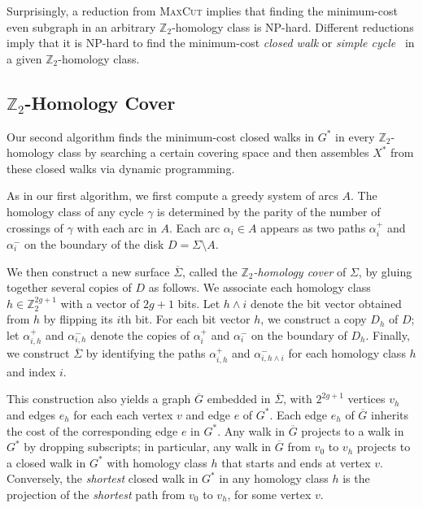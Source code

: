 \documentclass[natbib]{svcyclop}
\begin{document}
Surprisingly, a reduction from \textsc{MaxCut} implies that finding the minimum-cost even subgraph in an arbitrary $\mathbb{Z}_2$-homology class is NP-hard.  Different reductions imply that it is NP-hard to find the minimum-cost \emph{closed walk} \cite{ccelw-scsih-08} or \emph{simple cycle}~\cite{c-fscss-10} in a given $\mathbb{Z}_2$-homology class.

\subsection{$\mathbb{Z}_2$-Homology Cover}

Our second algorithm \cite{en-mcsnc-11} finds the minimum-cost closed walks in $G^*$ in every $\mathbb{Z}_2$-homology class by searching a certain covering space and then assembles $X^*$ from these closed walks via dynamic programming.

As in our first algorithm, we first compute a greedy system of arcs $A$.
The homology class of any cycle $\gamma$ is determined by the parity of the number of crossings of $\gamma$ with each arc in $A$.
Each arc $\alpha_i\in A$ appears as two paths $\alpha_i^+$ and $\alpha_i^-$ on the boundary of the disk $D = \Sigma\setminus A$.

We then construct a new surface $\overline\Sigma$, called the \emph{$\mathbb{Z}_2$-homology cover} of $\Sigma$, by gluing together several copies of $D$ as follows.   We associate each homology class $h\in\mathbb{Z}_2^{2g+1}$ with a vector of $2g+1$ bits.  Let $h \land i$ denote the bit vector obtained from $h$ by flipping its $i$th bit.  For each bit vector $h$, we construct a copy $D_h$ of $D$; let $\alpha^+_{i,h}$ and $\alpha^-_{i,h}$ denote the copies of $\alpha_i^+$ and $\alpha_i^-$ on the boundary of $D_h$.  Finally, we construct $\overline\Sigma$ by identifying the paths $\alpha^+_{i,h}$ and $\alpha^-_{i,h \land i}$ for each homology class $h$ and index $i$.%

This construction also yields a graph $\overline{G}$ embedded in $\overline\Sigma$, with $2^{2g+1}$ vertices $v_h$ and edges $e_h$ for each each vertex $v$ and edge $e$ of $G^*$.
Each edge $e_h$ of $\overline{G}$ inherits the cost of the corresponding edge $e$ in $G^*$.  
Any walk in $\overline{G}$ projects to a walk in $G^*$ by dropping subscripts; in particular, any walk in $\overline{G}$ from $v_0$ to $v_h$ projects to a closed walk in $G^*$ with homology class $h$ that starts and ends at vertex $v$.
Conversely, the \emph{shortest} closed walk in $G^*$ in any homology class $h$ is the projection of the \emph{shortest} path from $v_0$ to $v_h$, for some vertex $v$.
\end{document}
